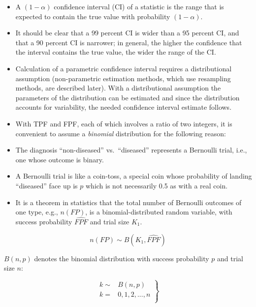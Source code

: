 \documentclass[
]{book}
\begin{document}
\begin{itemize}
\item
  A \((1-\alpha)\) confidence interval (CI) of a statistic is the range that is expected to contain the true value with probability \((1-\alpha)\).
\item
  It should be clear that a 99 percent CI is wider than a 95 percent CI, and that a 90 percent CI is narrower; in general, the higher the confidence that the interval contains the true value, the wider the range of the CI.
\item
  Calculation of a parametric confidence interval requires a distributional assumption (non-parametric estimation methods, which use resampling methods, are described later). With a distributional assumption the parameters of the distribution can be estimated and since the distribution accounts for variability, the needed confidence interval estimate follows.
\item
  With TPF and FPF, each of which involves a ratio of two integers, it is convenient to assume a \emph{binomial} distribution for the following reason:
\item
  The diagnosis ``non-diseased'' vs.~``diseased'' represents a Bernoulli trial, i.e., one whose outcome is binary.
\item
  A Bernoulli trial is like a coin-toss, a special coin whose probability of landing ``diseased'' face up is \(p\) which is not necessarily 0.5 as with a real coin.
\item
  It is a theorem in statistics that the total number of Bernoulli outcomes of one type, e.g., \(n(FP)\), is a binomial-distributed random variable, with success probability \(\widehat{FPF}\) and trial size \(K_1\).
\end{itemize}

\begin{equation} 
n(FP) \sim B\left ( K_1, \widehat{FPF} \right )
\label{eq:binary-task-model-BinDistrFPF}
\end{equation}

\(B(n,p)\) denotes the binomial distribution with success probability \(p\) and trial size \(n\):

\begin{equation} 
\left.
\begin{aligned}  
k \sim& B\left ( n, p \right )\\
k=& 0,1,2,...,n\\
\end{aligned}
\right \}
\label{eq:binary-task-model-bin-distr}
\end{equation}
\end{document}
